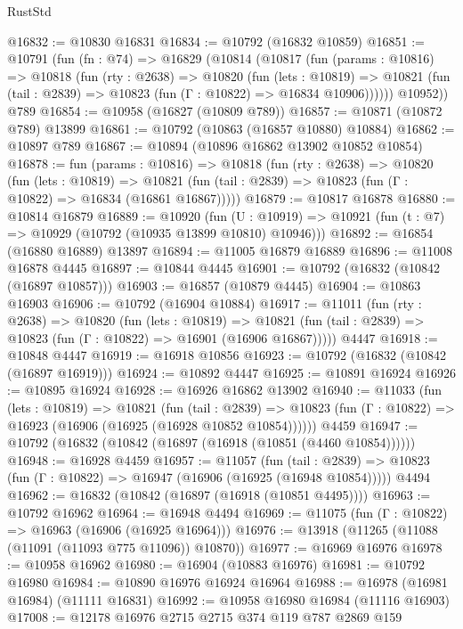 \begin{lexlean}{RustStd}
\begin{coremodule}
@16832 := @10830 @16831
@16834 := @10792 (@16832 @10859)
@16851 := @10791
    (fun (fn : @74) =>
    @16829
      (@10814
        (@10817
          (fun (params : @10816) =>
          @10818
            (fun (rty : @2638) =>
            @10820
              (fun (lets : @10819) =>
              @10821 (fun (tail : @2839) => @10823 (fun (Γ : @10822) => @16834 @10906))))))
        @10952))
    @789
@16854 := @10958 (@16827 (@10809 @789))
@16857 := @10871 (@10872 @789) @13899
@16861 := @10792 (@10863 (@16857 @10880) @10884)
@16862 := @10897 @789
@16867 := @10894 (@10896 @16862 @13902 @10852 @10854)
@16878 := fun (params : @10816) =>
  @10818
    (fun (rty : @2638) =>
    @10820
      (fun (lets : @10819) =>
      @10821 (fun (tail : @2839) => @10823 (fun (Γ : @10822) => @16834 (@16861 @16867)))))
@16879 := @10817 @16878
@16880 := @10814 @16879
@16889 := @10920
    (fun (U : @10919) => @10921 (fun (t : @7) => @10929 (@10792 (@10935 @13899 @10810) @10946)))
@16892 := @16854 (@16880 @16889) @13897
@16894 := @11005 @16879 @16889
@16896 := @11008 @16878 @4445
@16897 := @10844 @4445
@16901 := @10792 (@16832 (@10842 (@16897 @10857)))
@16903 := @16857 (@10879 @4445)
@16904 := @10863 @16903
@16906 := @10792 (@16904 @10884)
@16917 := @11011
    (fun (rty : @2638) =>
    @10820
      (fun (lets : @10819) =>
      @10821 (fun (tail : @2839) => @10823 (fun (Γ : @10822) => @16901 (@16906 @16867)))))
    @4447
@16918 := @10848 @4447
@16919 := @16918 @10856
@16923 := @10792 (@16832 (@10842 (@16897 @16919)))
@16924 := @10892 @4447
@16925 := @10891 @16924
@16926 := @10895 @16924
@16928 := @16926 @16862 @13902
@16940 := @11033
    (fun (lets : @10819) =>
    @10821
      (fun (tail : @2839) =>
      @10823 (fun (Γ : @10822) => @16923 (@16906 (@16925 (@16928 @10852 @10854))))))
    @4459
@16947 := @10792 (@16832 (@10842 (@16897 (@16918 (@10851 (@4460 @10854))))))
@16948 := @16928 @4459
@16957 := @11057
    (fun (tail : @2839) => @10823 (fun (Γ : @10822) => @16947 (@16906 (@16925 (@16948 @10854)))))
    @4494
@16962 := @16832 (@10842 (@16897 (@16918 (@10851 @4495))))
@16963 := @10792 @16962
@16964 := @16948 @4494
@16969 := @11075 (fun (Γ : @10822) => @16963 (@16906 (@16925 @16964)))
@16976 := @13918 (@11265 (@11088 (@11091 (@11093 @775 @11096)) @10870))
@16977 := @16969 @16976
@16978 := @10958 @16962
@16980 := @16904 (@10883 @16976)
@16981 := @10792 @16980
@16984 := @10890 @16976 @16924 @16964
@16988 := @16978 (@16981 @16984) (@11111 @16831)
@16992 := @10958 @16980 @16984 (@11116 @16903)
@17008 := @12178
    @16976
    @2715
    @2715
    @374
    @119
    @787
    @2869
    @159

\end{coremodule}
\end{lexlean}
